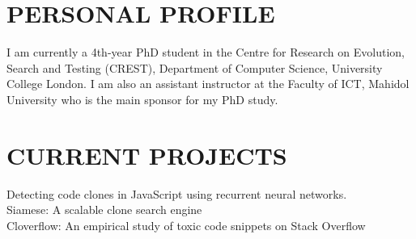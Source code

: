 \documentclass[margin, 10pt]{res} %
\begin{document}
\begin{resume}

 



\section{PERSONAL PROFILE}  

I am currently a 4th-year PhD student in the Centre for Research on Evolution, Search and Testing (CREST), Department of Computer Science, University College London. I am also an assistant instructor at the Faculty of ICT, Mahidol University who is the main sponsor for my PhD study.


\section{CURRENT PROJECTS}  

Detecting code clones in JavaScript using recurrent neural networks. \vspace{1mm} \\
Siamese: A scalable clone search engine \vspace{1mm} \\
Cloverflow: An empirical study of toxic code snippets on Stack Overflow \vspace{1mm} \\


\end{resume}
\end{document}
